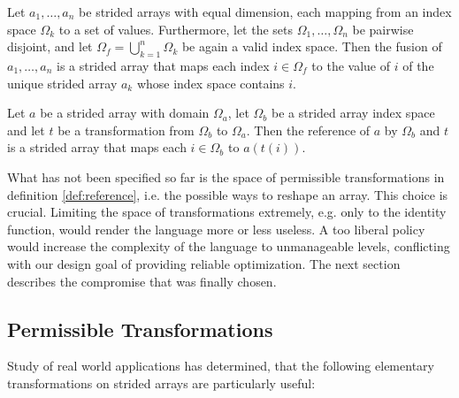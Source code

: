 \begin{define}[fusion]
  \label{def:fusion}
  Let $a_{1}, \ldots, a_{n}$ be strided arrays with equal dimension, each
  mapping from an index space $\Omega_{k}$ to a set of values.
  Furthermore, let the sets $\Omega_{1}, \ldots, \Omega_{n}$ be pairwise
  disjoint, and let $\Omega_f = \bigcup_{k=1}^{n} \Omega_{k}$ be again a
  valid index space. Then the fusion of $a_{1},\ldots, a_{n}$ is a strided
  array that maps each index $i \in \Omega_f$ to the value of $i$ of the
  unique strided array $a_{k}$ whose index space contains $i$.
\end{define}

\begin{define}[reference]
  \label{def:reference}
  Let $a$ be a strided array with domain $\Omega_a$, let $\Omega_b$ be a
  strided array index space and let $t$ be a transformation from $\Omega_b$
  to $\Omega_a$. Then the reference of $a$ by $\Omega_b$ and $t$ is a
  strided array that maps each $i \in \Omega_b$ to $a(t(i))$.
\end{define}

What has not been specified so far is the space of permissible
transformations in definition \ref{def:reference}, i.e. the possible ways
to reshape an array. This choice is crucial. Limiting the space of
transformations extremely, e.g. only to the identity function, would render
the language more or less useless. A too liberal policy would increase the
complexity of the language to unmanageable levels, conflicting with our
design goal of providing reliable optimization. The next section describes
the compromise that was finally chosen.

\subsection{Permissible Transformations}
\label{sec:transformations}

Study of real world applications has determined, that the following
elementary transformations on strided arrays are particularly useful:

